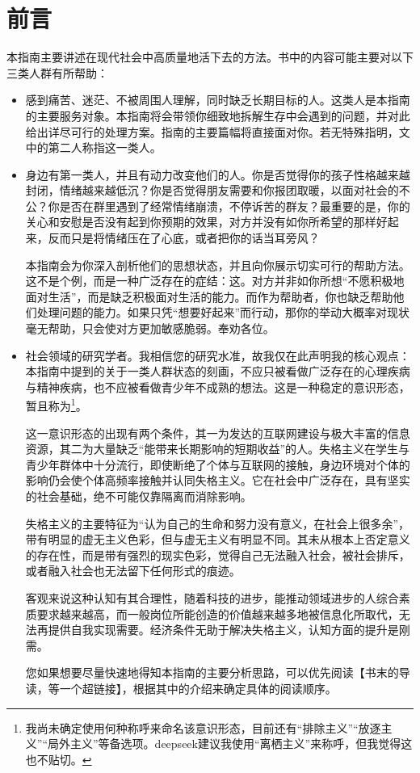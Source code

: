 \chapter{前言}                   


\noindent 本指南主要讲述在现代社会中高质量地活下去的方法。书中的内容可能主要对以下三类人群有所帮助：
\begin{itemize}
    \item 感到痛苦、迷茫、不被周围人理解，同时缺乏长期目标的人。这类人是本指南的主要服务对象。本指南将会带领你细致地拆解生存中会遇到的问题，并对此给出详尽可行的处理方案。指南的主要篇幅将直接面对你。若无特殊指明，文中的第二人称指这一类人。
    \item 身边有第一类人，并且有动力改变他们的人。你是否觉得你的孩子性格越来越封闭，情绪越来越低沉？你是否觉得朋友需要和你报团取暖，以面对社会的不公？你是否在群里遇到了经常情绪崩溃，不停诉苦的群友？最重要的是，你的关心和安慰是否没有起到你预期的效果，对方并没有如你所希望的那样好起来，反而只是将情绪压在了心底，或者把你的话当耳旁风？
    
    本指南会为你深入剖析他们的思想状态，并且向你展示切实可行的帮助方法。这不是个例，而是一种广泛存在的症结：这。对方并非如你所想“不愿积极地面对生活”，而是缺乏积极面对生活的能力。而作为帮助者，你也缺乏帮助他们处理问题的能力。如果只凭“想要好起来”而行动，那你的举动大概率对现状毫无帮助，只会使对方更加敏感脆弱。奉劝各位。
    \item 社会领域的研究学者。我相信您的研究水准，故我仅在此声明我的核心观点：本指南中提到的关于一类人群状态的刻画，不应只被看做广泛存在的心理疾病与精神疾病，也不应被看做青少年不成熟的想法。这是一种稳定的意识形态，暂且称为\footnote{我尚未确定使用何种称呼来命名该意识形态，目前还有“排除主义”“放逐主义”“局外主义”等备选项。deepseek建议我使用“离栖主义”来称呼，但我觉得这也不贴切。}。
    
    这一意识形态的出现有两个条件，其一为发达的互联网建设与极大丰富的信息资源，其二为大量缺乏“能带来长期影响的短期收益”的人。失格主义在学生与青少年群体中十分流行，即使断绝了个体与互联网的接触，身边环境对个体的影响仍会使个体高频率接触并认同失格主义。它在社会中广泛存在，具有坚实的社会基础，绝不可能仅靠隔离而消除影响。
    
    失格主义的主要特征为“认为自己的生命和努力没有意义，在社会上很多余”，带有明显的虚无主义色彩，但与虚无主义有明显不同。其未从根本上否定意义的存在性，而是带有强烈的现实色彩，觉得自己无法融入社会，被社会排斥，或者融入社会也无法留下任何形式的痕迹。
    
    客观来说这种认知有其合理性，随着科技的进步，能推动领域进步的人综合素质要求越来越高，而一般岗位所能创造的价值越来越多地被信息化所取代，无法再提供自我实现需要。经济条件无助于解决失格主义，认知方面的提升是刚需。

    您如果想要尽量快速地得知本指南的主要分析思路，可以优先阅读【书末的导读，等一个超链接】，根据其中的介绍来确定具体的阅读顺序。
\end{itemize}

